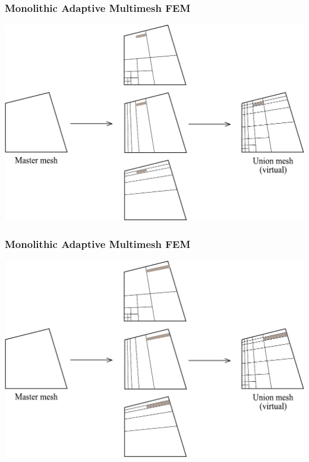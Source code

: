 \begin{frame}
  \frametitle{Monolithic Adaptive Multimesh FEM}
  \begin{center}
    \includegraphics[height=0.7\textheight]{multimesh/mm_28.pdf}
  \end{center}
\end{frame}

\begin{frame}
  \frametitle{Monolithic Adaptive Multimesh FEM}
  \begin{center}
    \includegraphics[height=0.7\textheight]{multimesh/mm_29.pdf}
  \end{center}
\end{frame}

